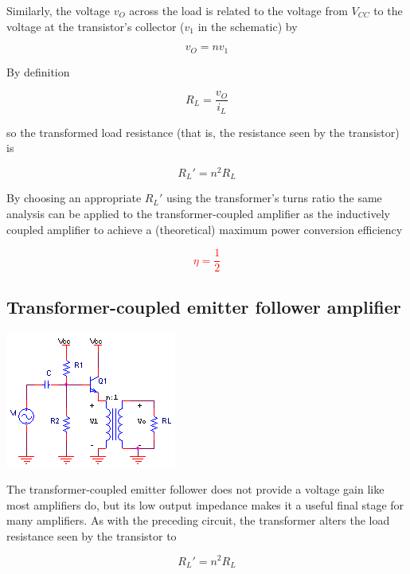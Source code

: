 Similarly, the voltage $v_{O}$ across the load is related to the voltage from $V_{CC}$ to the voltage at the transistor's collector ($v_{1}$ in the schematic) by

\begin{equation}
v_{O} = nv_{1}
\end{equation}

By definition

\begin{equation}
R_{L} = \frac{v_{O}}{i_{L}}
\end{equation}

so the transformed load resistance (that is, the resistance seen by the transistor) is

\begin{equation}
R_{L}' = n^{2}R_{L}
\end{equation}

By choosing an appropriate $R_{L}'$ using the transformer's turns ratio the same analysis can be applied to the transformer-coupled amplifier as the inductively coupled amplifier to achieve a (theoretical) maximum power conversion efficiency \autocite[589-590]{microelectronics-neaman}

\textcolor{red}{
\begin{equation}
\eta = \frac{1}{2}
\end{equation}
}

\subsection{Transformer-coupled emitter follower amplifier}
\begin{center}
		\includegraphics{schematics/transformeremitterfollower.png}
\end{center}
The transformer-coupled emitter follower does not provide a voltage gain like most amplifiers do, but its low output impedance makes it a useful final stage for many amplifiers.
As with the preceding circuit, the transformer alters the load resistance seen by the transistor to

\begin{equation}
R_{L}' = n^{2}R_{L}
\end{equation}

